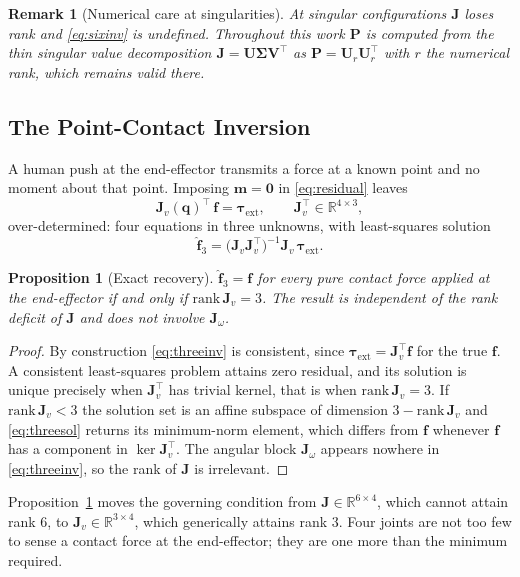 \documentclass{ieeeaccess}
\newtheorem{proposition}{Proposition}
\newtheorem{remark}{Remark}
\newcommand{\R}{\mathbb{R}}
\newcommand{\Jv}{\bm{J}_{\!v}}
\newcommand{\Jw}{\bm{J}_{\!\omega}}
\newcommand{\Jfull}{\bm{J}}
\newcommand{\Pobs}{\bm{P}}
\newcommand{\tauext}{\bm{\tau}_{\mathrm{ext}}}
\begin{document}
\begin{remark}[Numerical care at singularities]
At singular configurations $\Jfull$ loses rank and \eqref{eq:sixinv} is undefined.
Throughout this work $\Pobs$ is computed from the thin singular value
decomposition $\Jfull=\bm U\bm\Sigma\bm V^{\!\top}$ as
$\Pobs=\bm U_r\bm U_r^{\!\top}$ with $r$ the numerical rank, which remains valid
there.
\end{remark}

\subsection{The Point-Contact Inversion}
A human push at the end-effector transmits a force at a known point and no moment
about that point. Imposing $\bm m=\bm 0$ in \eqref{eq:residual} leaves
\begin{equation}
\Jv(\bm q)^{\!\top}\,\bm f=\tauext,\qquad \Jv^{\!\top}\in\R^{4\times3},
\label{eq:threeinv}
\end{equation}
over-determined: four equations in three unknowns, with least-squares solution
\begin{equation}
\hat{\bm f}_{3}=\big(\Jv\Jv^{\!\top}\big)^{-1}\Jv\,\tauext .
\label{eq:threesol}
\end{equation}

\begin{proposition}[Exact recovery]
$\hat{\bm f}_{3}=\bm f$ for every pure contact force applied at the end-effector
if and only if $\mathrm{rank}\,\Jv=3$. The result is independent of the rank
deficit of $\Jfull$ and does not involve $\Jw$.
\label{prop:exact}
\end{proposition}

\begin{proof}
By construction \eqref{eq:threeinv} is consistent, since $\tauext=\Jv^{\!\top}
\bm f$ for the true $\bm f$. A consistent least-squares problem attains zero
residual, and its solution is unique precisely when $\Jv^{\!\top}$ has trivial
kernel, that is when $\mathrm{rank}\,\Jv=3$. If $\mathrm{rank}\,\Jv<3$ the
solution set is an affine subspace of dimension $3-\mathrm{rank}\,\Jv$ and
\eqref{eq:threesol} returns its minimum-norm element, which differs from $\bm f$
whenever $\bm f$ has a component in $\ker\Jv^{\!\top}$. The angular block $\Jw$
appears nowhere in \eqref{eq:threeinv}, so the rank of $\Jfull$ is irrelevant.
\end{proof}

Proposition~\ref{prop:exact} moves the governing condition from
$\Jfull\in\R^{6\times4}$, which cannot attain rank $6$, to $\Jv\in\R^{3\times4}$,
which generically attains rank $3$. Four joints are not too few to sense a contact
force at the end-effector; they are one more than the minimum required.
\end{document}
